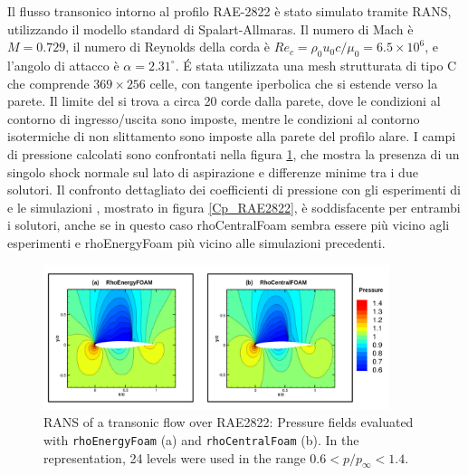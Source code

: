 \documentclass[a5paper]{sapthesis}
\begin{document}
		Il flusso transonico intorno al profilo RAE-2822 è stato simulato tramite RANS, utilizzando il modello standard di Spalart-Allmaras. Il numero di Mach è $M = 0.729$, il numero di Reynolds della corda è $Re_c = \rho_0 u_0 c /\mu_0 = 6.5 \times 10^6$, e l'angolo di attacco è $\alpha = 2.31^\circ$. \'E stata utilizzata una mesh strutturata di tipo C che comprende $369 \times 256$ celle, con tangente iperbolica che si estende verso la parete. Il limite del  si trova a circa 20 corde dalla parete, dove le condizioni al contorno di ingresso/uscita sono imposte, mentre le condizioni al contorno isotermiche di non slittamento sono imposte alla parete del profilo alare. I campi di pressione calcolati sono confrontati nella figura \ref{RAE2822_pressurefield}, che mostra la presenza di un singolo shock normale sul lato di aspirazione e differenze minime tra i due solutori. Il confronto dettagliato dei coeﬃcienti di pressione con gli esperimenti di \citet{cook1977aerofoil} e le simulazioni \cite{slater2010rae2822}, mostrato in figura \ref{Cp_RAE2822}, è soddisfacente per entrambi i solutori, anche se in questo caso rhoCentralFoam sembra essere più vicino agli esperimenti e rhoEnergyFoam più vicino alle simulazioni precedenti.
	
	\begin{figure}[htp]
		\centering
		\includegraphics[width=0.9\textwidth]{Figures/RAE2822_pressurefield}
		\caption[Pressure field of a RANS of a transonic flow over RAE2822]{RANS of a transonic flow over RAE2822: Pressure fields evaluated with \texttt{rhoEnergyFoam} (a) and \texttt{rhoCentralFoam} (b). In the representation, 24 levels were used in the range  $0.6 < p/p_\infty < 1.4$.}
		\label{RAE2822_pressurefield}
	\end{figure}
	
\end{document}

